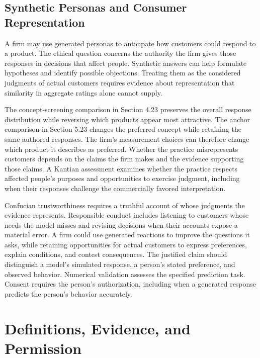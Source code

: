 \hypertarget{M09-synthetic-personas-and-consumer-representation}{%
\subsection{Synthetic Personas and Consumer
Representation}\label{M09-synthetic-personas-and-consumer-representation}}

\noindent \noindent A firm may use generated personas to anticipate how customers
could respond to a product. The ethical question concerns the authority
the firm gives those responses in decisions that affect people.
Synthetic answers can help formulate hypotheses and identify possible
objections. Treating them as the considered judgments of actual
customers requires evidence about representation that similarity in
aggregate ratings alone cannot supply.

The concept-screening comparison in Section 4.23 preserves the overall
response distribution while reversing which products appear most
attractive. The anchor comparison in Section 5.23 changes the preferred
concept while retaining the same authored responses. The firm's
measurement choices can therefore change which product it describes as
preferred. Whether the practice misrepresents customers depends on the
claims the firm makes and the evidence supporting those claims. A
Kantian assessment examines whether the practice respects affected
people's purposes and opportunities to exercise judgment, including when
their responses challenge the commercially favored interpretation.

Confucian trustworthiness requires a truthful account of whose judgments
the evidence represents. Responsible conduct includes listening to
customers whose needs the model misses and revising decisions when their
accounts expose a material error. A firm could use generated reactions
to improve the questions it asks, while retaining opportunities for
actual customers to express preferences, explain conditions, and contest
consequences. The justified claim should distinguish a model's simulated
response, a person's stated preference, and observed behavior. Numerical
validation assesses the specified prediction task. Consent requires the
person's authorization, including when a generated response predicts the
person's behavior accurately.


\hypertarget{M09-definitions-evidence-and-permission}{%
\section{Definitions, Evidence, and
Permission}\label{M09-definitions-evidence-and-permission}}

